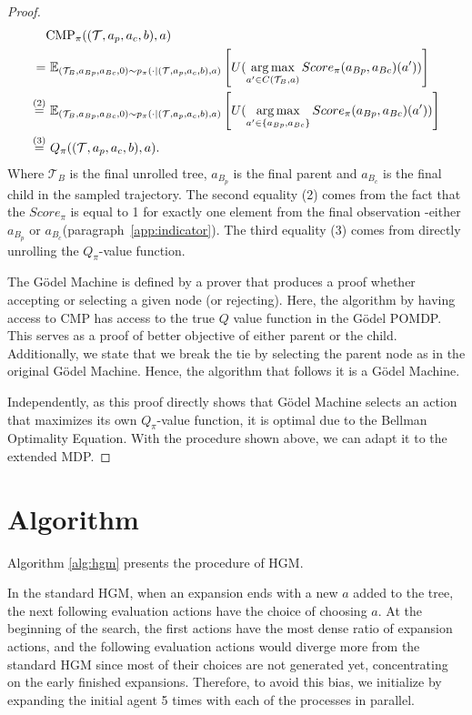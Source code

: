 \documentclass{article} %
\begin{document}
\begin{proof}
\begin{align*}
 &\mathrm{CMP}_{\pi}((\mathcal{T}, a_p, a_c, b),a) \\
 =& \ \mathbb{E}_{(\mathcal{T}_B, a_{Bp}, a_{Bc}, 0) \sim p_\pi(\cdot \mid (\mathcal{T}, a_p, a_c, b),a)}
 \left[   U(\operatorname*{arg\,max}_{a' \in C(\mathcal{T}_B, a)}Score_\pi(a_{Bp}, a_{Bc})(a'))    \right]  \\
\overset{(2)}{=}& \ \mathbb{E}_{(\mathcal{T}_B, a_{Bp}, a_{Bc}, 0) \sim p_\pi(\cdot \mid (\mathcal{T}, a_p, a_c, b), a)}
 \left[   U(\operatorname*{arg\,max}_{a' \in \{a_{Bp},a_{Bc}\}}Score_\pi(a_{Bp},a_{Bc})(a'))    \right]  \\
 \overset{(3)}{=}& \ Q_{\pi}((\mathcal{T}, a_p, a_c, b), a).
 \end{align*}
Where $\mathcal{T}_B$ is the final unrolled tree, $a_{B_p}$ is the final parent and $a_{B_c}$ is the final child in the sampled trajectory.
The second equality (2) comes from the fact that the $Score_\pi$ is equal to 1 for exactly one element from the final observation -either $a_{B_p}$ or $a_{B_c}$(paragraph~\ref{app:indicator}). The third equality (3) comes from directly unrolling the $Q_\pi$-value function. 

The G\"odel Machine is defined by a prover that produces a proof whether accepting or selecting a given node (or rejecting). Here, the algorithm by having access to $\mathrm{CMP}$ has access to the true $Q$ value function in the G\"odel POMDP. This serves as a proof of better objective of either parent or the child. Additionally, we state that we break the tie by selecting the parent node as in the original G\"odel Machine. Hence, the algorithm that follows it is a G\"odel Machine. 

Independently, as this proof directly shows that G\"odel Machine selects an action that maximizes its own $Q_\pi$-value function, it is optimal due to the Bellman Optimality Equation. With the procedure shown above, we can adapt it to the extended MDP. 




 \end{proof}




\newpage
\section{Algorithm}\label{app:alg}
Algorithm \ref{alg:hgm} presents the procedure of HGM.

In the standard HGM, when an expansion ends with a new $a$ added to the tree, the next following evaluation actions have the choice of choosing $a$.
At the beginning of the search, the first actions have the most dense ratio of expansion actions, and the following evaluation actions would diverge more from the standard HGM since most of their choices are not generated yet, concentrating on the early finished expansions. 
Therefore, to avoid this bias, we initialize by expanding the initial agent 5 times with each of the processes in parallel.
\end{document}

